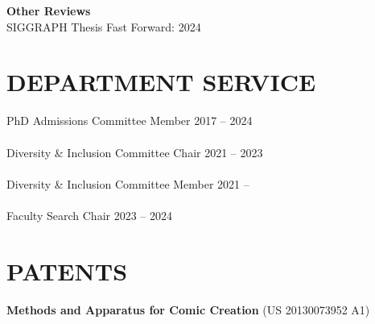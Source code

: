 \documentclass[line,margin]{res}
\begin{document}
\begin{resume}
\textbf{Other Reviews}\\
SIGGRAPH Thesis Fast Forward: 2024


\section{DEPARTMENT SERVICE}

PhD Admissions Committee Member \hfill 2017 -- 2024
\\ \\
Diversity \& Inclusion Committee Chair \hfill 2021 -- 2023
\\ \\
Diversity \& Inclusion Committee Member \hfill 2021 -- 
\\ \\
Faculty Search Chair \hfill 2023 -- 2024








\section{PATENTS}

\newcommand{\patent}[2] {
	\textbf{#1} (#2)
}

\patent
{Methods and Apparatus for Comic Creation}
{US 20130073952 A1}



\end{resume}
\end{document}
